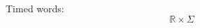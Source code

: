 
\begin{definition}\label{definition:TimedWord}
    Timed words:
    $$\mathbb{R}\times\Sigma$$
\end{definition}